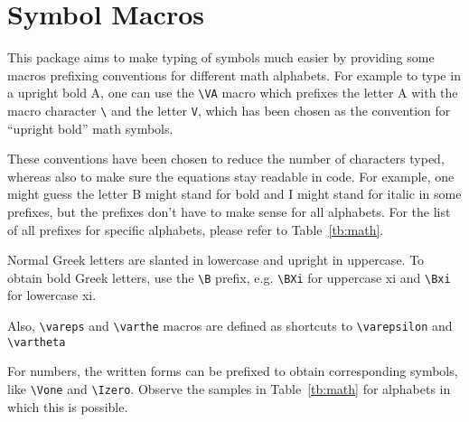 \documentclass[DIV15]{scrartcl}
\begin{document}
\section{Symbol Macros}

This package aims to make typing of symbols much easier by providing some macros
prefixing conventions for different math alphabets. For example to type in a
upright bold A, one can use the \verb+\VA+ macro which prefixes the letter A
with the macro character \verb+\+ and the letter \verb+V+, which has been chosen
as the convention for ``upright bold'' math symbols.

These conventions have been chosen to reduce the number of characters typed,
whereas also to make sure the equations stay readable in code. For example, one might guess
the letter B might stand for bold and I might stand for italic in some prefixes,
but the prefixes don't have to make sense for all alphabets.
For the list of all prefixes for
specific alphabets, please refer to Table~\ref{tb:math}.

Normal Greek letters are slanted in lowercase and upright in uppercase. To
obtain bold Greek letters, use the \verb+\B+ prefix, e.g. \verb+\BXi+ for
uppercase xi and \verb+\Bxi+ for lowercase xi.

Also, \verb+\vareps+ and \verb+\varthe+ macros are defined as shortcuts to \verb+\varepsilon+ and \verb+\vartheta+

For numbers, the written forms can be prefixed to obtain corresponding symbols,
like \verb+\Vone+ and \verb+\Izero+. Observe the samples in Table~\ref{tb:math}
for alphabets in which this is possible.
\end{document}
